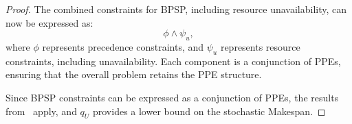 \begin{proof}
The combined constraints for BPSP, including resource unavailability, can now be expressed as:
\[
\phi \wedge \psi_u,
\]
where \( \phi \) represents precedence constraints, and \( \psi_u \) represents resource constraints, including unavailability. Each component is a conjunction of PPEs, ensuring that the overall problem retains the PPE structure.

Since BPSP constraints can be expressed as a conjunction of PPEs, the results from~\cite{beck2007proactive} apply, and \( q_U \) provides a lower bound on the stochastic Makespan.

\end{proof} 









